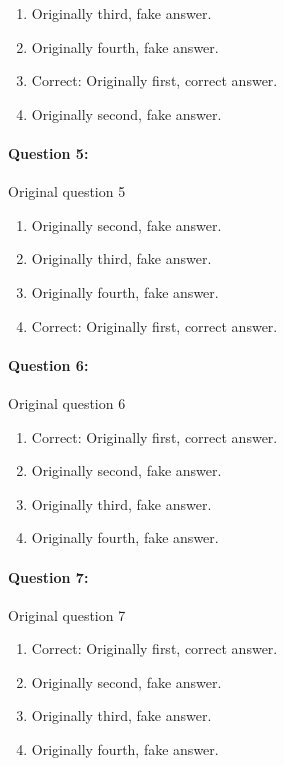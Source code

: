\documentclass[9pt, twoside, twocolumn]{extarticle}
\begin{document}
\begin{enumerate}[label=\textbf{{\Alph*}},labelindent=0pt, labelsep=1.5em, parsep=0.2em]
\item Originally third, fake answer.
\item Originally fourth, fake answer.
\item Correct: Originally first, correct answer.
\item Originally second, fake answer.
\end{enumerate}
\paragraph{Question 5:}
Original question 5

\begin{enumerate}[label=\textbf{{\Alph*}},labelindent=0pt, labelsep=1.5em, parsep=0.2em]
\item Originally second, fake answer.
\item Originally third, fake answer.
\item Originally fourth, fake answer.
\item Correct: Originally first, correct answer.
\end{enumerate}
\paragraph{Question 6:}
Original question 6

\begin{enumerate}[label=\textbf{{\Alph*}},labelindent=0pt, labelsep=1.5em, parsep=0.2em]
\item Correct: Originally first, correct answer.
\item Originally second, fake answer.
\item Originally third, fake answer.
\item Originally fourth, fake answer.
\end{enumerate}
\paragraph{Question 7:}
Original question 7

\begin{enumerate}[label=\textbf{{\Alph*}},labelindent=0pt, labelsep=1.5em, parsep=0.2em]
\item Correct: Originally first, correct answer.
\item Originally second, fake answer.
\item Originally third, fake answer.
\item Originally fourth, fake answer.
\end{enumerate}
\end{document}
